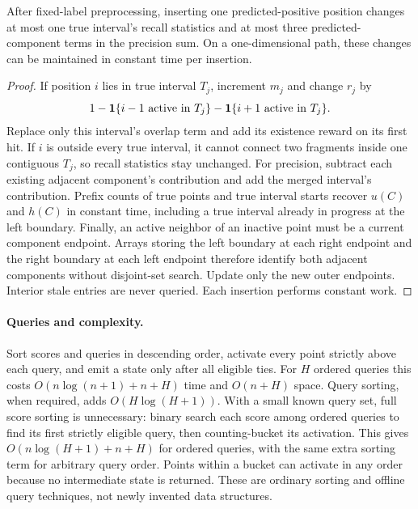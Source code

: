 \begin{proposition}
After fixed-label preprocessing, inserting one predicted-positive position
changes at most one true interval's recall statistics and at most three
predicted-component terms in the precision sum. On a one-dimensional path,
these changes can be maintained in constant time per insertion.
\end{proposition}
\begin{proof}
If position $i$ lies in true interval $T_j$, increment $m_j$ and change $r_j$ by
\[
 1-\mathbf{1}\{i-1\text{ active in }T_j\}
  -\mathbf{1}\{i+1\text{ active in }T_j\}.
\]
Replace only this interval's overlap term and add its existence reward on its
first hit. If $i$ is outside every true interval, it cannot connect two
fragments inside one contiguous $T_j$, so recall statistics stay unchanged.
For precision, subtract each existing adjacent component's contribution and
add the merged interval's contribution. Prefix counts of true points and true
interval starts recover $u(C)$ and $h(C)$ in constant time, including a true
interval already in progress at the left boundary. Finally, an active neighbor
of an inactive point must be a current component endpoint. Arrays storing the
left boundary at each right endpoint and the right boundary at each left
endpoint therefore identify both adjacent components without disjoint-set
search. Update only the new outer endpoints. Interior stale entries are never
queried. Each insertion performs constant work.
\end{proof}

\paragraph{Queries and complexity.}
Sort scores and queries in descending order, activate every point strictly
above each query, and emit a state only after all eligible ties. For $H$ ordered
queries this costs $O(n\log(n+1)+n+H)$ time and $O(n+H)$ space. Query sorting,
when required, adds $O(H\log(H+1))$. With a small known query set, full score
sorting is unnecessary: binary search each score among ordered queries to
find its first strictly eligible query, then counting-bucket its activation.
This gives $O(n\log(H+1)+n+H)$ for ordered queries, with the same extra sorting
term for arbitrary query order. Points within a bucket can activate in any
order because no intermediate state is returned. These are ordinary sorting
and offline query techniques, not newly invented data structures.

